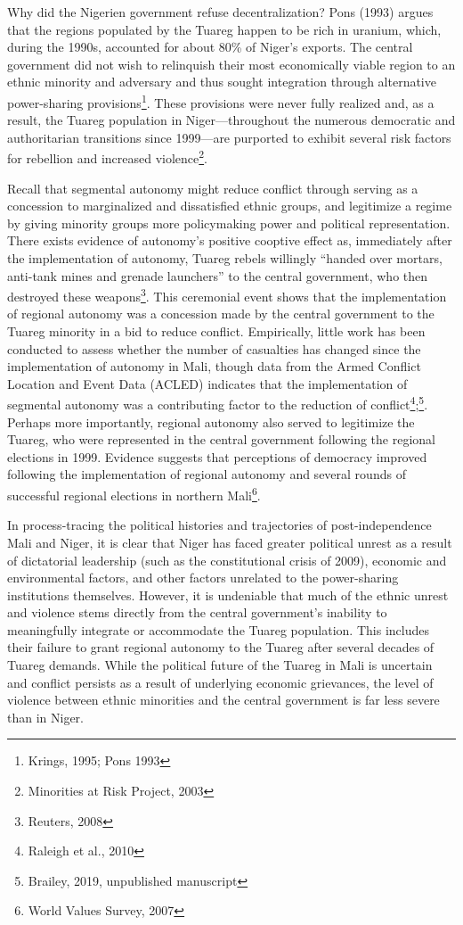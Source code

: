 \documentclass[12pt]{article}
\begin{document}
Why did the Nigerien government refuse decentralization? Pons (1993) argues that the regions populated by the Tuareg happen to be rich in uranium, which, during the 1990s, accounted for about 80\% of Niger's exports. The central government did not wish to relinquish their most economically viable region to an ethnic minority and adversary and thus sought integration through alternative power-sharing provisions\footnote{Krings, 1995; Pons 1993}. These provisions were never fully realized and, as a result, the Tuareg population in Niger---throughout the numerous democratic and authoritarian transitions since 1999---are purported to exhibit several risk factors for rebellion and increased violence\footnote{Minorities at Risk Project, 2003}. 

Recall that segmental autonomy might reduce conflict through serving as a concession to marginalized and dissatisfied ethnic groups, and legitimize a regime by giving minority groups more policymaking power and political representation. There exists evidence of autonomy's positive cooptive effect as, immediately after the implementation of autonomy, Tuareg rebels willingly ``handed over mortars, anti-tank mines and grenade launchers'' to the central government, who then destroyed these weapons\footnote{Reuters, 2008}. This ceremonial event shows that the implementation of regional autonomy was a concession made by the central government to the Tuareg minority in a bid to reduce conflict. Empirically, little work has been conducted to assess whether the number of casualties has changed since the implementation of autonomy in Mali, though data from the Armed Conflict Location and Event Data (ACLED) indicates that the implementation of segmental autonomy was a contributing factor to the reduction of conflict\footnote{Raleigh et al., 2010};\footnote{Brailey, 2019, unpublished manuscript}. Perhaps more importantly, regional autonomy also served to legitimize the Tuareg, who were represented in the central government following the regional elections in 1999. Evidence suggests that perceptions of democracy improved following the implementation of regional autonomy and several rounds of successful regional elections in northern Mali\footnote{World Values Survey, 2007}.

In process-tracing the political histories and trajectories of post-independence Mali and Niger, it is clear that Niger has faced greater political unrest as a result of dictatorial leadership (such as the constitutional crisis of 2009), economic and environmental factors, and other factors unrelated to the power-sharing institutions themselves. However, it is undeniable that much of the ethnic unrest and violence stems directly from the central government's inability to meaningfully integrate or accommodate the Tuareg population. This includes their failure to grant regional autonomy to the Tuareg after several decades of Tuareg demands. While the political future of the Tuareg in Mali is uncertain and conflict persists as a result of underlying economic grievances, the level of violence between ethnic minorities and the central government is far less severe than in Niger.
\end{document}
